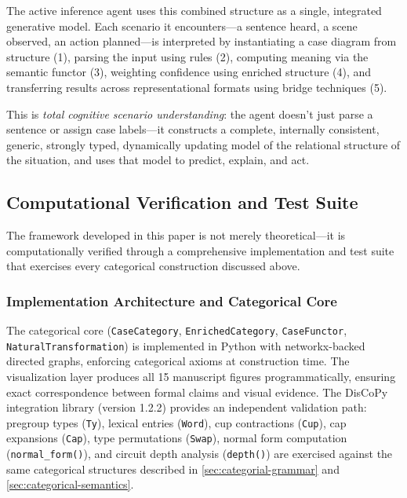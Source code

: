 \documentclass[
]{article}
\numberwithin{equation}{section}
\begin{document}
The active inference agent uses this combined structure as a single,
integrated generative model. Each scenario it encounters---a sentence
heard, a scene observed, an action planned---is interpreted by
instantiating a case diagram from structure (1), parsing the input using
rules (2), computing meaning via the semantic functor (3), weighting
confidence using enriched structure (4), and transferring results across
representational formats using bridge techniques (5).

This is \emph{total cognitive scenario understanding}: the agent doesn't
just parse a sentence or assign case labels---it constructs a complete,
internally consistent, generic, strongly typed, dynamically updating
model of the relational structure of the situation, and uses that model
to predict, explain, and act.

\subsection{Computational Verification and Test
Suite}\label{computational-verification-and-test-suite}

The framework developed in this paper is not merely theoretical---it is
computationally verified through a comprehensive implementation and test
suite that exercises every categorical construction discussed above.

\subsubsection{Implementation Architecture and Categorical
Core}\label{implementation-architecture-and-categorical-core}

The categorical core (\texttt{CaseCategory}, \texttt{EnrichedCategory},
\texttt{CaseFunctor}, \texttt{NaturalTransformation}) is implemented in
Python with networkx-backed directed graphs, enforcing categorical
axioms at construction time. The visualization layer produces all 15
manuscript figures programmatically, ensuring exact correspondence
between formal claims and visual evidence. The DisCoPy integration
library (version 1.2.2) provides an independent validation path:
pregroup types (\texttt{Ty}), lexical entries (\texttt{Word}), cup
contractions (\texttt{Cup}), cap expansions (\texttt{Cap}), type
permutations (\texttt{Swap}), normal form computation
(\texttt{normal\_form()}), and circuit depth analysis (\texttt{depth()})
are exercised against the same categorical structures described in
\autoref{sec:categorial-grammar} and
\autoref{sec:categorical-semantics}.
\end{document}
